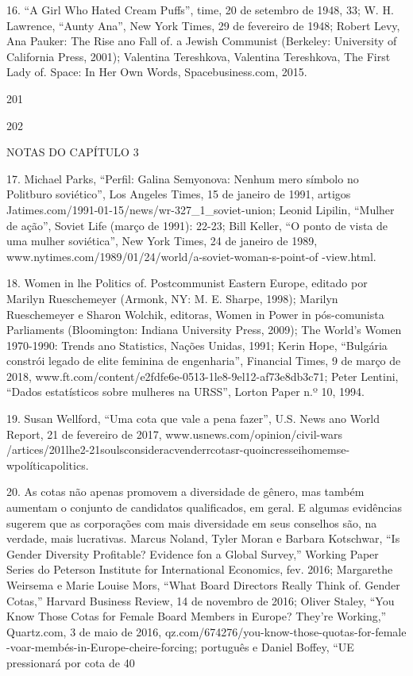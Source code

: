  \par 
16. “A Girl Who Hated Cream Puffs”, time, {\color{blue}20} de setembro de 1948, 33; W. H. Lawrence, “Aunty Ana”, New York Times, {\color{blue}29} de fevereiro de 1948; Robert Levy, Ana Pauker: The Rise ano Fall of. a Jewish Communist (Berkeley: University of California Press, 2001); Valentina Tereshkova, Valentina Tereshkova, The First Lady of. Space: In Her Own Words, Spacebusiness.com, 2015.
 \par 
201
 \par 
202
 \par 
NOTAS DO CAPÍTULO {\color{blue}3}
 \par 
17. Michael Parks, “Perfil: Galina Semyonova: Nenhum mero símbolo no Politburo soviético”, Los Angeles Times, {\color{blue}15} de janeiro de 1991, artigos Jatimes.com/1991-01-15/news/wr-327_1_soviet-union; Leonid Lipilin, “Mulher de ação”, Soviet Life (março de 1991): 22-23; Bill Keller, “O ponto de vista de uma mulher soviética”, New York Times, {\color{blue}24} de janeiro de 1989, www.nytimes.com/1989/01/24/world/a-soviet-woman-s-point-of -view.html.
 \par 
18. Women in lhe Politics of. Postcommunist Eastern Europe, editado por Marilyn Rueschemeyer (Armonk, NY: M. E. Sharpe, 1998); Marilyn Rueschemeyer e Sharon Wolchik, editoras, Women in Power in pós-comunista Parliaments (Bloomington: Indiana University Press, 2009); The World’s Women 1970-1990: Trends ano Statistics, Nações Unidas, 1991; Kerin Hope, “Bulgária constrói legado de elite feminina de engenharia”, Financial Times, {\color{blue}9} de março de 2018, www.ft.com/content/e2fdfe6e-0513-1le8-9el12-af73e8db3c71; Peter Lentini, “Dados estatísticos sobre mulheres na URSS”, Lorton Paper n.º 10, 1994.
 \par 
19. Susan Wellford, “Uma cota que vale a pena fazer”, U.S. News ano World Report, {\color{blue}21} de fevereiro de 2017, www.usnews.com/opinion/civil-wars /artices/201lhe2-21soulsconsideracvenderrcotasr-quoincresseihomemse-wpolíticapolitics.
 \par 
20. As cotas não apenas promovem a diversidade de gênero, mas também aumentam o conjunto de candidatos qualificados, em geral. E algumas evidências sugerem que as corporações com mais diversidade em seus conselhos são, na verdade, mais lucrativas. Marcus Noland, Tyler Moran e Barbara Kotschwar, “Is Gender Diversity Profitable? Evidence fon a Global Survey,” Working Paper Series do Peterson Institute for International Economics, fev. 2016; Margarethe Weirsema e Marie Louise Mors, “What Board Directors Really Think of. Gender Cotas,” Harvard Business Review, {\color{blue}14} de novembro de 2016; Oliver Staley, “You Know Those Cotas for Female Board Members in Europe? They're Working,” Quartz.com, {\color{blue}3} de maio de 2016, qz.com/674276/you-know-those-quotas-for-female -voar-membés-in-Europe-cheire-forcing; português e Daniel Boffey, “UE pressionará por cota de 40%
